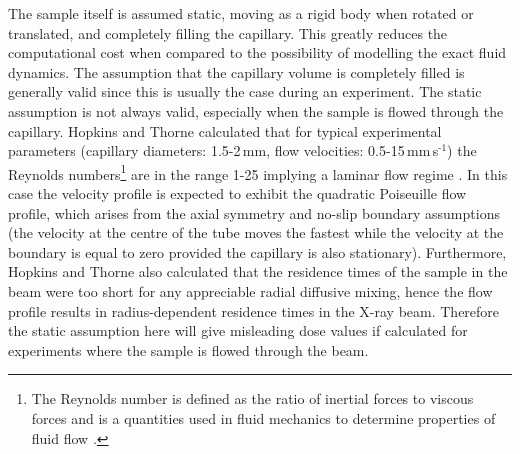 The sample itself is assumed static, moving as a rigid body when rotated or translated, and completely filling the capillary.
This greatly reduces the computational cost when compared to the possibility of modelling the exact fluid dynamics.
The assumption that the capillary volume is completely filled is generally valid since this is usually the case during an experiment.
The static assumption is not always valid, especially when the sample is flowed through the capillary.
Hopkins and Thorne calculated that for typical experimental parameters (capillary diameters: 1.5-2$\,$mm, flow velocities: 0.5-15$\,$mm$\,$s$^{\text{-1}}$) the Reynolds numbers\footnote{The Reynolds number is defined as the ratio of inertial forces to viscous forces and is a quantities used in fluid mechanics to determine properties of fluid flow \cite{purcell1977life}.} are in the range 1-25 implying a laminar flow regime \cite{hopkins2016quantifying}.
In this case the velocity profile is expected to exhibit the quadratic Poiseuille flow profile, which arises from the axial symmetry and no-slip boundary assumptions (the velocity at the centre of the tube moves the fastest while the velocity at the boundary is equal to zero provided the capillary is also stationary).
Furthermore, Hopkins and Thorne also calculated that the residence times of the sample in the beam were too short for any appreciable radial diffusive mixing, hence the flow profile results in radius-dependent residence times in the X-ray beam.
Therefore the static assumption here will give misleading dose values if calculated for experiments where the sample is flowed through the beam.

